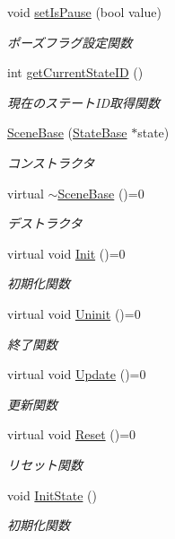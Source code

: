 \begin{DoxyCompactItemize}
void \mbox{\hyperlink{class_scene_base_a38f9cab88bd112b92f5a93e4541a605a}{set\+Is\+Pause}} (bool value)
\begin{DoxyCompactList}\small\item\em ポーズフラグ設定関数 \end{DoxyCompactList}\item 
int \mbox{\hyperlink{class_scene_base_afb3f808f6a46816606a6b0692401e7ca}{get\+Current\+State\+ID}} ()
\begin{DoxyCompactList}\small\item\em 現在のステート\+I\+D取得関数 \end{DoxyCompactList}\item 
\mbox{\hyperlink{class_scene_base_aeafd60485ad8b2191f40da3013d50f2c}{Scene\+Base}} (\mbox{\hyperlink{class_scene_base_1_1_state_base}{State\+Base}} $\ast$state)
\begin{DoxyCompactList}\small\item\em コンストラクタ \end{DoxyCompactList}\item 
virtual \mbox{\hyperlink{class_scene_base_aab20c0332c7ecde0af12a4efe0e53781}{$\sim$\+Scene\+Base}} ()=0
\begin{DoxyCompactList}\small\item\em デストラクタ \end{DoxyCompactList}\item 
virtual void \mbox{\hyperlink{class_scene_base_a24d7db43c819924dc8b07b436f6d3148}{Init}} ()=0
\begin{DoxyCompactList}\small\item\em 初期化関数 \end{DoxyCompactList}\item 
virtual void \mbox{\hyperlink{class_scene_base_a175987954480e29219a4e3a1d840bbe4}{Uninit}} ()=0
\begin{DoxyCompactList}\small\item\em 終了関数 \end{DoxyCompactList}\item 
virtual void \mbox{\hyperlink{class_scene_base_a596ef75258a6e4d843d81f01cc0c28da}{Update}} ()=0
\begin{DoxyCompactList}\small\item\em 更新関数 \end{DoxyCompactList}\item 
virtual void \mbox{\hyperlink{class_scene_base_a80611ca266dc84f466b96913ace28b8e}{Reset}} ()=0
\begin{DoxyCompactList}\small\item\em リセット関数 \end{DoxyCompactList}\item 
void \mbox{\hyperlink{class_scene_base_a5b3fa9bbe3015ccaef844ee5b6017c3a}{Init\+State}} ()
\begin{DoxyCompactList}\small\item\em 初期化関数 \end{DoxyCompactList}\end{DoxyCompactItemize}
